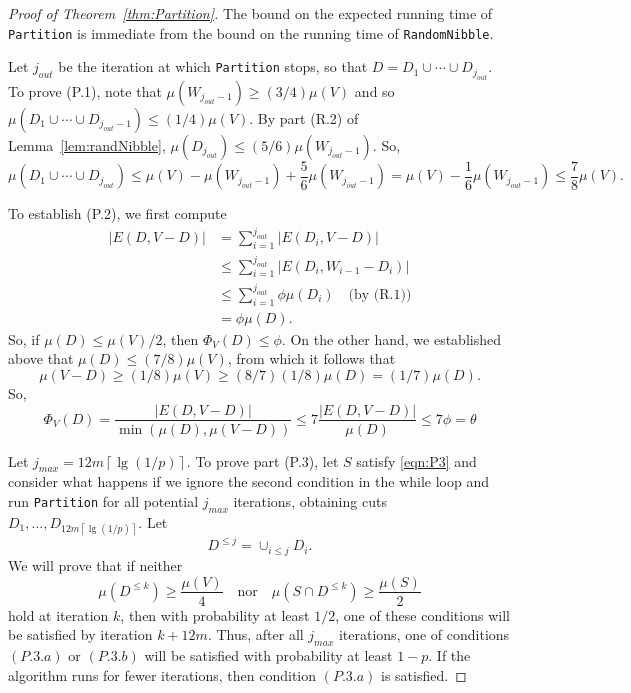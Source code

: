 \documentclass[11pt]{article}
\def\union{\cup}
\def\intersect{\cap}
\def\sizeof#1{\left|#1  \right|}
\def\intersect{\cap}
\newcommand{\ceiling}[1]{\left\lceil#1\right\rceil}
\def\conduc#1#2{\Phi_{#1}\left(#2  \right)}
\def\vol#1{\mu \left(#1  \right)}
\begin{document}
\begin{proof}[Proof of Theorem~\ref{thm:Partition}]
The bound on the expected running time of \texttt{Partition}
  is immediate from the bound on the running time of \texttt{RandomNibble}.

Let $j_{out}$ be the iteration at which \texttt{Partition} stops,
  so that $D = D_{1} \union \dotsb \union D_{j_{out}}$.
To prove (P.1), note that
  $\vol{W_{j_{out}-1}} \geq (3/4) \vol{V}$ and so
  $\vol{D_{1} \union \dotsb \union D_{j_{out}-1}} \leq (1/4) \vol{V}$.
By part (R.2) of Lemma~\ref{lem:randNibble},
  $\vol{D_{j_{out}}} \leq  (5/6) \vol{W_{j_{out}-1}}$.
So,
\[
\vol{D_{1} \union \dotsb \union D_{j_{out}}}
\leq 
\vol{V} - \vol{W_{j_{out}-1}} + \frac{5}{6} \vol{W_{j_{out}-1}} 
= 
\vol{V} - \frac{1}{6} \vol{W_{j_{out}-1}} 
\leq
 \frac{7}{8} \vol{V}.
\]

To establish (P.2),
  we first compute
\begin{align*}
\sizeof{E (D, V-D)}
& =
\sum_{i=1}^{j_{out}} \sizeof{E (D_{i}, V-D)}\\
& \leq
\sum_{i=1}^{j_{out}}
  \sizeof{E (D_{i}, W_{i-1} - D_{i})}\\
& \leq
\sum_{i=1}^{j_{out}}
  \phi \vol{D_{i}} \quad
\text{(by (R.1))}
\\
& = \phi  \vol{D}.
\end{align*}
So, if  $\vol{D} \leq \vol{V}/2$,
  then $ \conduc{V}{D} \leq \phi$.
On the other hand, we established above that
  $\vol{D} \leq (7/8) \vol{V}$, from which
  it follows that
\[
  \vol{V-D} \geq (1/8) \vol{V} \geq (8/7) (1/8) \vol{D} = (1/7) \vol{D}.
\]
So,
\[
  \conduc{V}{D}
=
 \frac{\sizeof{E (D, V-D)}}
      {\min \left(\vol{D}, \vol{V-D} \right)}
\leq
7  \frac{\sizeof{E (D, V-D)}}{\vol{D}}
\leq
7 \phi
=
\theta
\]

Let $j_{max} = 12 m \ceiling{\lg (1/p)}$.
To prove part (P.3), let $S$ satisfy \eqref{eqn:P3} and
  consider what happens if we ignore the second condition in the
  while loop and run
  \texttt{Partition} for all
  potential $j_{max}$ iterations, obtaining
  cuts $D_{1}, \dotsc , D_{12 m \ceiling{\lg (1/p)}}$.
Let 
\[
D^{\leq j} = \union_{i \leq j} D_{i}.
\]
We will prove that if neither 
\[
\vol{D^{\leq k}} \geq \frac{\vol{V}}{4}
\quad
\text{nor}
\quad
\vol{S \intersect D^{\leq k}} \geq \frac{\vol{S}}{2}
\]
hold at iteration $k$, then with probability at least $1/2$, one of these
  conditions will be satisfied by iteration $k + 12 m$.
Thus, after all $j_{max}$ iterations, one of conditions
  $(P.3.a)$ or $(P.3.b)$ will be satisfied with probability
  at least $1-p$.
If the algorithm runs for fewer iterations, then condition $(P.3.a)$
  is satisfied.


\end{proof}
\end{document}
